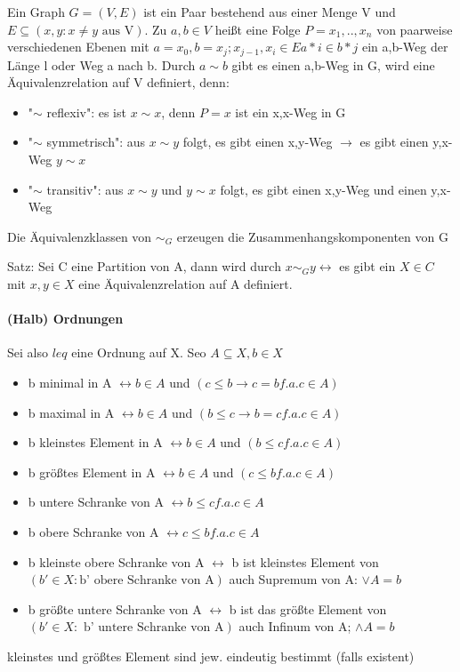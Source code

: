 \documentclass[a4paper]{article}
\begin{document}
\begin{multicols}{3}
    Ein Graph $G=(V,E)$ ist ein Paar bestehend aus einer Menge V und $E\subseteq (x,y: x \not = y \text{ aus V} )$.
    Zu $a,b\in V$ heißt eine Folge $P=x_1,..,x_n$ von paarweise verschiedenen Ebenen mit $a=x_0, b=x_j; x_{j-1},x_i \in E{a*i \in b*j}$ ein a,b-Weg der Länge l oder Weg a nach b. Durch $a\sim b$ gibt es einen a,b-Weg in G, wird eine Äquivalenzrelation auf V definiert, denn:
    \begin{itemize}
        \item "$\sim$ reflexiv": es ist $x\sim x$, denn $P=x$ ist ein x,x-Weg in G
        \item "$\sim$ symmetrisch": aus $x\sim y$ folgt, es gibt einen x,y-Weg $\rightarrow$ es gibt einen y,x-Weg $y\sim x$
        \item "$\sim$ transitiv": aus $x\sim y$ und $y\sim x$ folgt, es gibt einen x,y-Weg und einen y,x-Weg
    \end{itemize}
    Die Äquivalenzklassen von $\sim _G$ erzeugen die Zusammenhangskomponenten von G
    
    Satz: Sei C eine Partition von A, dann wird durch $x\sim _G y \leftrightarrow$ es gibt ein $X\in C$ mit $x,y\in X$ eine Äquivalenzrelation auf A definiert.
    
    \paragraph{(Halb) Ordnungen}
    Sei also $leq$ eine Ordnung auf X. Seo $A\subseteq X, b\in X$
    \begin{itemize}
        \item b minimal in A $\leftrightarrow b\in A$ und $(c\leq b \rightarrow c=b f.a. c\in A)$
        \item b maximal in A $\leftrightarrow b\in A$ und $(b\leq c \rightarrow b=c f.a. c\in A)$
        \item b kleinstes Element in A $\leftrightarrow b\in A$ und $(b\leq c f.a. c\in A)$
        \item b größtes Element in A $\leftrightarrow b\in A$ und $(c\leq b f.a. c\in A)$
        \item b untere Schranke von A $\leftrightarrow b\leq c f.a. c\in A$
        \item b obere Schranke von A $\leftrightarrow c\leq b f.a. c\in A$
        \item b kleinste obere Schranke von A $\leftrightarrow$ b ist kleinstes Element von $(b'\in X: \text{b' obere Schranke von A})$ auch Supremum von A: $\lor A = b$
        \item b größte untere Schranke von A $\leftrightarrow$ b ist das größte Element von $(b'\in X: \text{ b' untere Schranke von A} )$ auch Infinum von A; $\land A = b$
    \end{itemize}
    kleinstes und größtes Element sind jew. eindeutig bestimmt (falls existent)
    

\end{multicols}
\end{document}
